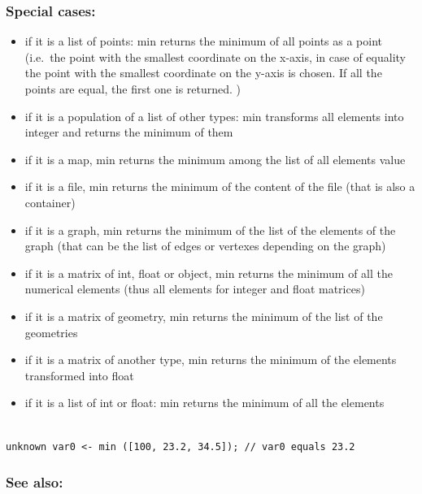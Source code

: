\documentclass[]{book}
\providecommand{\tightlist}{%
  \setlength{\itemsep}{0pt}\setlength{\parskip}{0pt}}
\theoremstyle{definition}
\theoremstyle{definition}
\theoremstyle{definition}
\theoremstyle{remark}
\begin{document}
\subsubsection{Special cases:}\label{special-cases-98}

\begin{itemize}
\tightlist
\item
  if it is a list of points: min returns the minimum of all points as a
  point (i.e.~the point with the smallest coordinate on the x-axis, in
  case of equality the point with the smallest coordinate on the y-axis
  is chosen. If all the points are equal, the first one is returned. )\\
\item
  if it is a population of a list of other types: min transforms all
  elements into integer and returns the minimum of them\\
\item
  if it is a map, min returns the minimum among the list of all elements
  value\\
\item
  if it is a file, min returns the minimum of the content of the file
  (that is also a container)\\
\item
  if it is a graph, min returns the minimum of the list of the elements
  of the graph (that can be the list of edges or vertexes depending on
  the graph)\\
\item
  if it is a matrix of int, float or object, min returns the minimum of
  all the numerical elements (thus all elements for integer and float
  matrices)\\
\item
  if it is a matrix of geometry, min returns the minimum of the list of
  the geometries\\
\item
  if it is a matrix of another type, min returns the minimum of the
  elements transformed into float\\
\item
  if it is a list of int or float: min returns the minimum of all the
  elements
\end{itemize}

\begin{verbatim}
 
unknown var0 <- min ([100, 23.2, 34.5]); // var0 equals 23.2
\end{verbatim}

\subsubsection{See also:}\label{see-also-141}
\end{document}
